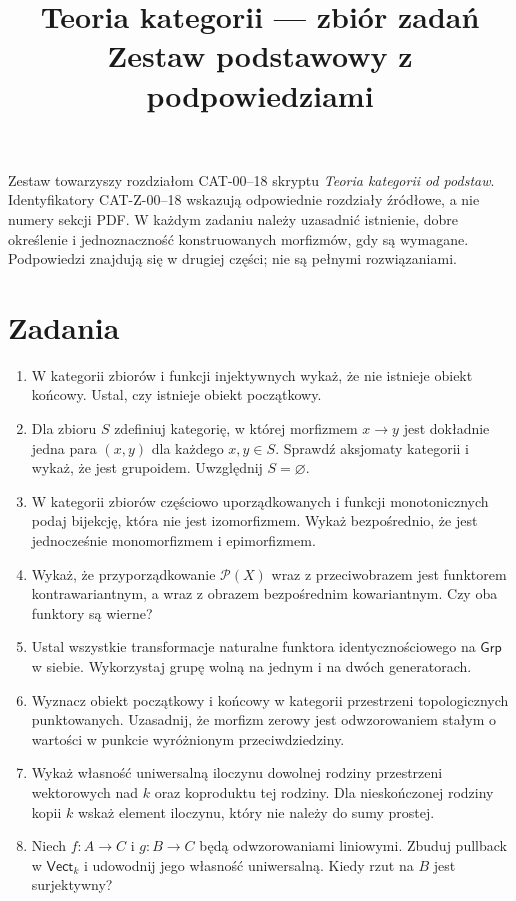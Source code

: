 \documentclass[11pt,a4paper]{article}
\title{Teoria kategorii — zbiór zadań\\\large Zestaw podstawowy z podpowiedziami}
\author{}
\date{}
\newcommand{\Vect}{\mathsf{Vect}}
\newcommand{\Grp}{\mathsf{Grp}}
\begin{document}
\maketitle
Zestaw towarzyszy rozdziałom CAT-00--18 skryptu \emph{Teoria kategorii od podstaw}.
Identyfikatory CAT-Z-00--18 wskazują odpowiednie rozdziały źródłowe, a nie numery sekcji PDF.
W każdym zadaniu należy uzasadnić istnienie, dobre określenie i jednoznaczność konstruowanych morfizmów, gdy są wymagane. Podpowiedzi znajdują się w drugiej części; nie są pełnymi rozwiązaniami.
\section{Zadania}
\begin{enumerate}
\item[\textbf{CAT-Z-00}] W kategorii zbiorów i funkcji injektywnych wykaż, że nie istnieje obiekt końcowy. Ustal, czy istnieje obiekt początkowy.
\item[\textbf{CAT-Z-01}] Dla zbioru $S$ zdefiniuj kategorię, w której morfizmem $x\to y$ jest dokładnie jedna para $(x,y)$ dla każdego $x,y\in S$. Sprawdź aksjomaty kategorii i wykaż, że jest grupoidem. Uwzględnij $S=\varnothing$.
\item[\textbf{CAT-Z-02}] W kategorii zbiorów częściowo uporządkowanych i funkcji monotonicznych podaj bijekcję, która nie jest izomorfizmem. Wykaż bezpośrednio, że jest jednocześnie monomorfizmem i epimorfizmem.
\item[\textbf{CAT-Z-03}] Wykaż, że przyporządkowanie $\mathcal P(X)$ wraz z przeciwobrazem jest funktorem kontrawariantnym, a wraz z obrazem bezpośrednim kowariantnym. Czy oba funktory są wierne?
\item[\textbf{CAT-Z-04}] Ustal wszystkie transformacje naturalne funktora identycznościowego na $\Grp$ w siebie. Wykorzystaj grupę wolną na jednym i na dwóch generatorach.
\item[\textbf{CAT-Z-05}] Wyznacz obiekt początkowy i końcowy w kategorii przestrzeni topologicznych punktowanych. Uzasadnij, że morfizm zerowy jest odwzorowaniem stałym o wartości w punkcie wyróżnionym przeciwdziedziny.
\item[\textbf{CAT-Z-06}] Wykaż własność uniwersalną iloczynu dowolnej rodziny przestrzeni wektorowych nad $k$ oraz koproduktu tej rodziny. Dla nieskończonej rodziny kopii $k$ wskaż element iloczynu, który nie należy do sumy prostej.
\item[\textbf{CAT-Z-07}] Niech $f:A\to C$ i $g:B\to C$ będą odwzorowaniami liniowymi. Zbuduj pullback w $\Vect_k$ i udowodnij jego własność uniwersalną. Kiedy rzut na $B$ jest surjektywny?

\end{enumerate}
\end{document}
